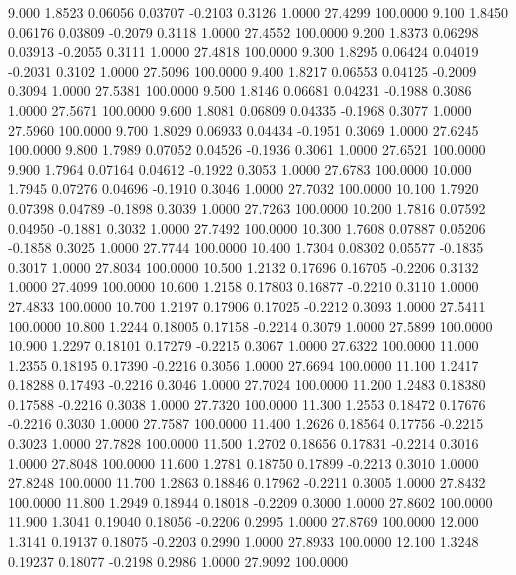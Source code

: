    9.000   1.8523   0.06056   0.03707  -0.2103   0.3126   1.0000  27.4299 100.0000
   9.100   1.8450   0.06176   0.03809  -0.2079   0.3118   1.0000  27.4552 100.0000
   9.200   1.8373   0.06298   0.03913  -0.2055   0.3111   1.0000  27.4818 100.0000
   9.300   1.8295   0.06424   0.04019  -0.2031   0.3102   1.0000  27.5096 100.0000
   9.400   1.8217   0.06553   0.04125  -0.2009   0.3094   1.0000  27.5381 100.0000
   9.500   1.8146   0.06681   0.04231  -0.1988   0.3086   1.0000  27.5671 100.0000
   9.600   1.8081   0.06809   0.04335  -0.1968   0.3077   1.0000  27.5960 100.0000
   9.700   1.8029   0.06933   0.04434  -0.1951   0.3069   1.0000  27.6245 100.0000
   9.800   1.7989   0.07052   0.04526  -0.1936   0.3061   1.0000  27.6521 100.0000
   9.900   1.7964   0.07164   0.04612  -0.1922   0.3053   1.0000  27.6783 100.0000
  10.000   1.7945   0.07276   0.04696  -0.1910   0.3046   1.0000  27.7032 100.0000
  10.100   1.7920   0.07398   0.04789  -0.1898   0.3039   1.0000  27.7263 100.0000
  10.200   1.7816   0.07592   0.04950  -0.1881   0.3032   1.0000  27.7492 100.0000
  10.300   1.7608   0.07887   0.05206  -0.1858   0.3025   1.0000  27.7744 100.0000
  10.400   1.7304   0.08302   0.05577  -0.1835   0.3017   1.0000  27.8034 100.0000
  10.500   1.2132   0.17696   0.16705  -0.2206   0.3132   1.0000  27.4099 100.0000
  10.600   1.2158   0.17803   0.16877  -0.2210   0.3110   1.0000  27.4833 100.0000
  10.700   1.2197   0.17906   0.17025  -0.2212   0.3093   1.0000  27.5411 100.0000
  10.800   1.2244   0.18005   0.17158  -0.2214   0.3079   1.0000  27.5899 100.0000
  10.900   1.2297   0.18101   0.17279  -0.2215   0.3067   1.0000  27.6322 100.0000
  11.000   1.2355   0.18195   0.17390  -0.2216   0.3056   1.0000  27.6694 100.0000
  11.100   1.2417   0.18288   0.17493  -0.2216   0.3046   1.0000  27.7024 100.0000
  11.200   1.2483   0.18380   0.17588  -0.2216   0.3038   1.0000  27.7320 100.0000
  11.300   1.2553   0.18472   0.17676  -0.2216   0.3030   1.0000  27.7587 100.0000
  11.400   1.2626   0.18564   0.17756  -0.2215   0.3023   1.0000  27.7828 100.0000
  11.500   1.2702   0.18656   0.17831  -0.2214   0.3016   1.0000  27.8048 100.0000
  11.600   1.2781   0.18750   0.17899  -0.2213   0.3010   1.0000  27.8248 100.0000
  11.700   1.2863   0.18846   0.17962  -0.2211   0.3005   1.0000  27.8432 100.0000
  11.800   1.2949   0.18944   0.18018  -0.2209   0.3000   1.0000  27.8602 100.0000
  11.900   1.3041   0.19040   0.18056  -0.2206   0.2995   1.0000  27.8769 100.0000
  12.000   1.3141   0.19137   0.18075  -0.2203   0.2990   1.0000  27.8933 100.0000
  12.100   1.3248   0.19237   0.18077  -0.2198   0.2986   1.0000  27.9092 100.0000
